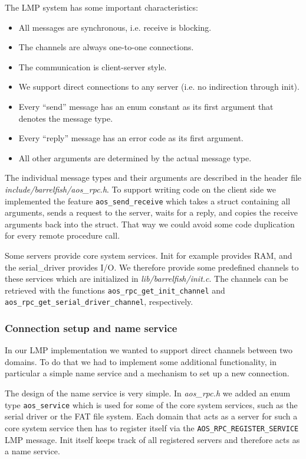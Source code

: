 \documentclass[a4paper,10pt]{article}
\newcommand{\filepath}[1]{\emph{ #1}}
\begin{document}
The LMP system has some important characteristics:
\begin{itemize}
 \item All messages are synchronous, i.e. receive is blocking.
 \item The channels are always one-to-one connections.
 \item The communication is client-server style.
 \item We support direct connections to any server (i.e. no indirection through init).
 \item Every ``send'' message has an enum constant as its first argument that denotes the message type.
 \item Every ``reply'' message has an error code as its first argument.
 \item All other arguments are determined by the actual message type.
\end{itemize}

The individual message types and their arguments are described in the header file \filepath{include/barrelfish/aos\_rpc.h}.
To support writing code on the client side we implemented the feature \lstinline!aos_send_receive! which takes a struct containing all arguments, 
sends a request to the server, waits for a reply, and copies the receive arguments back into the struct.
That way we could avoid some code duplication for every remote procedure call.

Some servers provide core system services. Init for example provides RAM, and the serial\_driver provides I/O.
We therefore provide some predefined channels to these services which are initialized in \filepath{lib/barrelfish/init.c}.
The channels can be retrieved with the functions \lstinline!aos_rpc_get_init_channel! and \lstinline!aos_rpc_get_serial_driver_channel!, respectively.

\subsubsection{Connection setup and name service}

In our LMP implementation we wanted to support direct channels between two domains.
To do that we had to implement some additional functionality, in particular a simple name service and a mechanism to set up a new connection.

The design of the name service is very simple.
In \filepath{aos\_rpc.h} we added an enum type \lstinline!aos_service! which is used for some of the core system services, such as the serial driver or the FAT file system.
Each domain that acts as a server for such a core system service then has to register itself via the \lstinline!AOS_RPC_REGISTER_SERVICE! LMP message.
Init itself keeps track of all registered servers and therefore acts as a name service.
\end{document}

